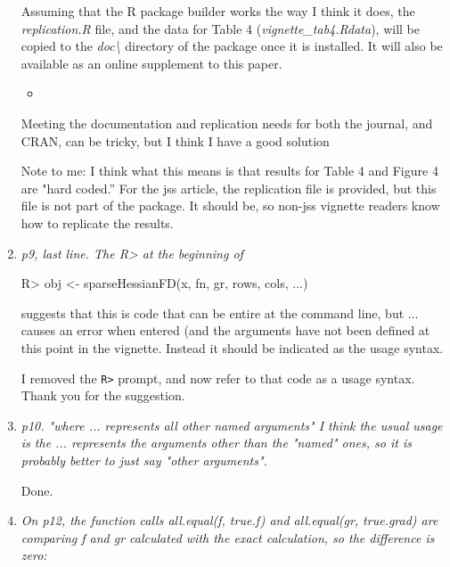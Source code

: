 \documentclass{article}
\newcommand{\filename}[1]{\textit{#1}}
\newcommand{\code}[1]{\texttt{#1}}
\newcommand{\func}[1]{\code{#1}}
\newenvironment{revQuote}{\itshape}{\vspace{\baselineskip}}
\newenvironment{response}{\normalfont}{\vspace{\baselineskip}}
\begin{document}
\begin{enumerate}[align=left]
  \begin{response}
Assuming that the R package builder works the way I think it does,
the \filename{replication.R} file, and the data for Table 4 (\filename{vignette\_tab4.Rdata}), will be
copied to the \filename{doc\textbackslash} directory of the package
once it is installed.  It will also be available as an online supplement to
this paper.
\begin{itemize}
\item 
\end{itemize}


Meeting the documentation and replication needs for both the journal,
and CRAN, can be tricky, but I think I have a good solution

    
  Note to me:  I think what this means is that results for Table 4 and
  Figure 4 are "hard coded.''  For the jss article, the replication
  file is provided, but this file is not part of the package.  It
  should be, so non-jss vignette readers know how to replicate the results. 
\end{response}


\item \begin{revQuote}
p9, last line. The R> at the beginning of
 
   R> obj <- sparseHessianFD(x, fn, gr, rows, cols, ...)

suggests that this is code that can be entire at the command line, but ...
causes an error when entered (and the arguments have not been defined at
this point in the vignette. Instead it should be indicated as the usage
syntax.
  \end{revQuote}

\begin{response}
  I removed the \func{R>} prompt, and now refer to that code as a usage
  syntax.  Thank you for the suggestion.
\end{response}


\item \begin{revQuote}
p10. "where ... represents all other named arguments"
   I think the usual usage is the ... represents the arguments other than
the "named" ones, so it is probably better to just say "other arguments".
\end{revQuote}

\begin{response}
  Done.
\end{response}


\item \begin{revQuote}
On p12, the function calls all.equal(f, true.f) and all.equal(gr,
true.grad) are comparing f and gr calculated with the exact calculation, so
the difference is zero:



\end{revQuote}
\end{enumerate}
\end{document}

